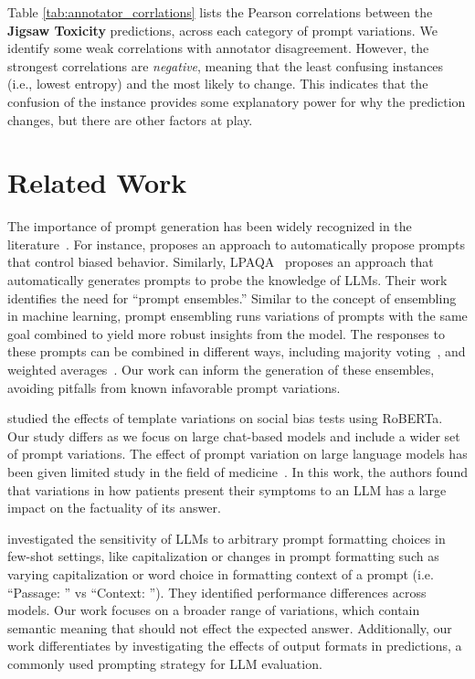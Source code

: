 \documentclass[11pt, dvipsnames]{article}
\begin{document}
Table \ref{tab:annotator_corrlations} lists the Pearson correlations between the \textbf{Jigsaw Toxicity} predictions, across each category of prompt variations. We identify some weak correlations with annotator disagreement. However, the strongest correlations are \textit{negative}, meaning that the least confusing instances (i.e., lowest entropy) and the most likely to change. This indicates that the confusion of the instance provides some explanatory power for why the prediction changes, but there are other factors at play.%

\section{Related Work}
The importance of prompt generation has been widely recognized in the literature~\cite{liu2023pre}. For instance, \cite{schick2020few} proposes an approach to automatically propose prompts that control biased behavior. Similarly, LPAQA~\cite{jiang2020can} proposes an approach that automatically generates prompts to probe the knowledge of LLMs. Their work identifies the need for ``prompt ensembles.'' Similar to the concept of ensembling in machine learning, prompt ensembling runs variations of prompts with the same goal combined to yield more robust insights from the model. The responses to these prompts can be combined in different ways, including majority voting~\cite{hambardzumyan2021warp}, and weighted averages~\cite{qin2021learning}. Our work can inform the generation of these ensembles, avoiding pitfalls from known infavorable prompt variations.

\citet{seshadri2022quantifying} studied the effects of template variations on social bias tests using RoBERTa. Our study differs as we focus on large chat-based models and include a wider set of prompt variations.
The effect of prompt variation on large language models has been given limited study in the field of medicine~\cite{zuccon2023dr}. In this work, the authors found that variations in how patients present their symptoms to an LLM has a large impact on the factuality of its answer.

\citet{sclar2023quantifying} investigated the sensitivity of LLMs to arbitrary prompt formatting choices in few-shot settings, like capitalization or changes in prompt formatting such as varying capitalization or word choice in formatting context of a prompt (i.e. ``Passage: '' vs ``Context: ''). They identified performance differences across models. Our work focuses on a broader range of variations, which contain semantic meaning that should not effect the expected answer. Additionally, our work differentiates by investigating the effects of output formats in predictions, a commonly used prompting strategy for LLM evaluation.
\end{document}

